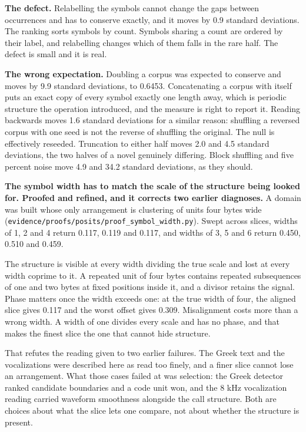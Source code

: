 \textbf{The defect.} Relabelling the symbols cannot change the gaps between occurrences and has to conserve exactly, and it moves by 0.9 standard deviations. The ranking sorts symbols by count. Symbols sharing a count are ordered by their label, and relabelling changes which of them falls in the rare half. The defect is small and it is real.

\textbf{The wrong expectation.} Doubling a corpus was expected to conserve and moves by 9.9 standard deviations, to 0.6453. Concatenating a corpus with itself puts an exact copy of every symbol exactly one length away, which is periodic structure the operation introduced, and the measure is right to report it. Reading backwards moves 1.6 standard deviations for a similar reason: shuffling a reversed corpus with one seed is not the reverse of shuffling the original. The null is effectively reseeded. Truncation to either half moves 2.0 and 4.5 standard deviations, the two halves of a novel genuinely differing. Block shuffling and five percent noise move 4.9 and 34.2 standard deviations, as they should.

\textbf{The symbol width has to match the scale of the structure being looked for. Proofed and refined, and it corrects two earlier diagnoses.} A domain was built whose only arrangement is clustering of units four bytes wide (\texttt{evidence/\allowbreak{}proofs/\allowbreak{}posits/\allowbreak{}proof\_\allowbreak{}symbol\_\allowbreak{}width.\allowbreak{}py}). Swept across slices, widths of 1, 2 and 4 return 0.117, 0.119 and 0.117, and widths of 3, 5 and 6 return 0.450, 0.510 and 0.459.

The structure is visible at every width dividing the true scale and lost at every width coprime to it. A repeated unit of four bytes contains repeated subsequences of one and two bytes at fixed positions inside it, and a divisor retains the signal. Phase matters once the width exceeds one: at the true width of four, the aligned slice gives 0.117 and the worst offset gives 0.309. Misalignment costs more than a wrong width. A width of one divides every scale and has no phase, and that makes the finest slice the one that cannot hide structure.

That refutes the reading given to two earlier failures. The Greek text and the vocalizations were described here as read too finely, and a finer slice cannot lose an arrangement. What those cases failed at was selection: the Greek detector ranked candidate boundaries and a code unit won, and the 8 kHz vocalization reading carried waveform smoothness alongside the call structure. Both are choices about what the slice lets one compare, not about whether the structure is present.

